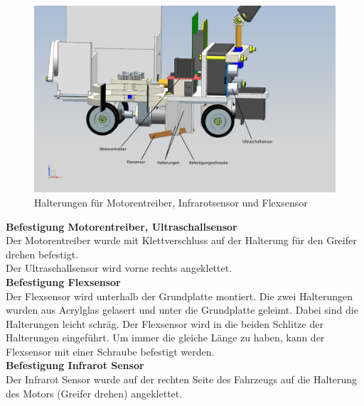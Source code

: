 \begin{figure}[H]
\centering
\includegraphics[width=1\textwidth]{03_Loesungskonzept/pictures/halterungen1.png}
\caption{Halterungen für Motorentreiber, Infrarotsensor und Flexsensor}
\end{figure}
\textbf{Befestigung Motorentreiber, Ultraschallsensor}\\[0.2cm]
Der Motorentreiber wurde mit Klettverschluss auf der Halterung für den Greifer drehen befestigt.\\[0.2cm]
Der Ultraschallsensor wird vorne rechts angeklettet.\\[0.2cm]
\textbf{Befestigung Flexsensor}\\[0.2cm]
Der Flexsensor wird unterhalb der Grundplatte montiert. Die zwei Halterungen wurden aus Acrylglas gelasert und unter die Grundplatte geleimt. Dabei sind die Halterungen leicht schräg. Der Flexsensor wird in die beiden Schlitze der Halterungen eingeführt. Um immer die gleiche Länge zu haben, kann der Flexsensor mit einer Schraube befestigt werden.\\[0.2cm]
\textbf{Befestigung Infrarot Sensor}\\[0.2cm]
Der Infrarot Sensor wurde auf der rechten Seite des Fahrzeugs auf die Halterung des Motors (Greifer drehen) angeklettet.